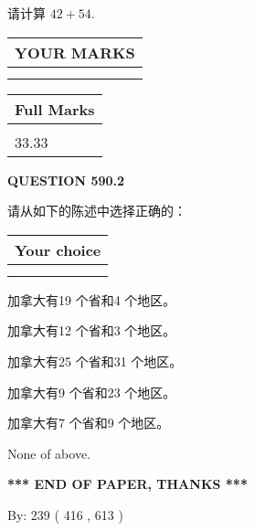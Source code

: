 \documentclass{ctexart}
\begin{document}
  
 
请计算 $ %
42 +  %
54 $.
 

 

 
  
\vspace{0.2in}
  
\noindent\begin{tabular}{|l|}
\hline
 YOUR MARKS  \\
\hline
 \\ 
 \\ 
\hline
\end{tabular}
\hspace{0.05in} \begin{tabular}{|l|}
\hline
 Full Marks  \\
\hline
 \\ 
33.33 \\
\hline
\end{tabular}
{\textbf{\Large{QUESTION
590.2 
}}}
  
  
请从如下的陈述中选择正确的：
  
  
\noindent\hspace{3.0in} \begin{tabular}{|l|}
\hline
Your choice \\
\hline
 \\ 
 \\ 
\hline
\end{tabular}
  
  
 
 
加拿大有19 个省和4 个地区。
 
 
加拿大有12 个省和3 个地区。
 
 
加拿大有25 个省和31 个地区。
 
 
加拿大有9 个省和23 个地区。
 
 
加拿大有7 个省和9 个地区。
 
 
 None of above.
 
 
   
   
 \vspace{0.2in}
 
   
   
   
   
\vspace{1.0in} 
{\textbf{\large{ *** END OF PAPER, THANKS *** }}} 
   
   
\hspace{1.0in} By: 
 239 ( 416 ,  613 )
   
\end{document}
